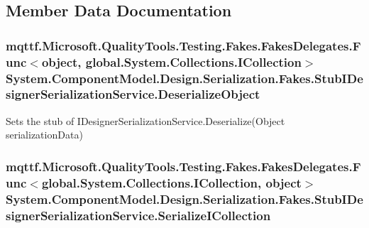 \subsection{Member Data Documentation}
\hypertarget{class_system_1_1_component_model_1_1_design_1_1_serialization_1_1_fakes_1_1_stub_i_designer_serialization_service_a0e420e015f3cb5db169522569e56e4e1}{
\subsubsection[{Deserialize\-Object}]{\setlength{\rightskip}{0pt plus 5cm}mqttf.\-Microsoft.\-Quality\-Tools.\-Testing.\-Fakes.\-Fakes\-Delegates.\-Func$<$object, global.\-System.\-Collections.\-I\-Collection$>$ System.\-Component\-Model.\-Design.\-Serialization.\-Fakes.\-Stub\-I\-Designer\-Serialization\-Service.\-Deserialize\-Object}}\label{class_system_1_1_component_model_1_1_design_1_1_serialization_1_1_fakes_1_1_stub_i_designer_serialization_service_a0e420e015f3cb5db169522569e56e4e1}


Sets the stub of I\-Designer\-Serialization\-Service.\-Deserialize(\-Object serialization\-Data)

\hypertarget{class_system_1_1_component_model_1_1_design_1_1_serialization_1_1_fakes_1_1_stub_i_designer_serialization_service_ad2d76f7c4411974736767e6fe16386a6}{
\subsubsection[{Serialize\-I\-Collection}]{\setlength{\rightskip}{0pt plus 5cm}mqttf.\-Microsoft.\-Quality\-Tools.\-Testing.\-Fakes.\-Fakes\-Delegates.\-Func$<$global.\-System.\-Collections.\-I\-Collection, object$>$ System.\-Component\-Model.\-Design.\-Serialization.\-Fakes.\-Stub\-I\-Designer\-Serialization\-Service.\-Serialize\-I\-Collection}}\label{class_system_1_1_component_model_1_1_design_1_1_serialization_1_1_fakes_1_1_stub_i_designer_serialization_service_ad2d76f7c4411974736767e6fe16386a6}


